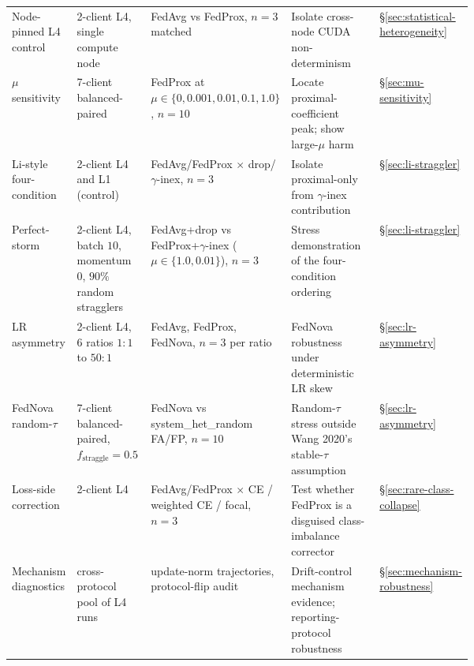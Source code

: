 \documentclass[11pt,a4paper]{report}
\begin{document}
\begin{table}[H]
{\begin{tabular}{l p{0.18\linewidth} p{0.22\linewidth} p{0.28\linewidth} l}
Node-pinned L4 control           & 2-client L4, single compute node             & FedAvg vs FedProx, $n = 3$ matched                       & Isolate cross-node CUDA non-determinism                                       & §\ref{sec:statistical-heterogeneity}            \\
$\mu$ sensitivity                & 7-client balanced-paired                     & FedProx at $\mu \in \{0, 0.001, 0.01, 0.1, 1.0\}$, $n = 10$ & Locate proximal-coefficient peak; show large-$\mu$ harm                      & §\ref{sec:mu-sensitivity}                       \\
Li-style four-condition          & 2-client L4 and L1 (control)                 & FedAvg/FedProx $\times$ drop/$\gamma$-inex, $n = 3$       & Isolate proximal-only from $\gamma$-inex contribution                         & §\ref{sec:li-straggler}                         \\
Perfect-storm                    & 2-client L4, batch $10$, momentum $0$, $90\%$ random stragglers & FedAvg+drop vs FedProx+$\gamma$-inex ($\mu \in \{1.0, 0.01\}$), $n = 3$ & Stress demonstration of the four-condition ordering                        & §\ref{sec:li-straggler}                         \\
LR asymmetry                     & 2-client L4, 6 ratios $1{:}1$ to $50{:}1$    & FedAvg, FedProx, FedNova, $n = 3$ per ratio              & FedNova robustness under deterministic LR skew                                & §\ref{sec:lr-asymmetry}                         \\
FedNova random-$\tau$            & 7-client balanced-paired, $f_{\textrm{straggle}} = 0.5$ & FedNova vs system\_het\_random FA/FP, $n = 10$           & Random-$\tau$ stress outside Wang 2020's stable-$\tau$ assumption             & §\ref{sec:lr-asymmetry}                         \\
Loss-side correction             & 2-client L4                                  & FedAvg/FedProx $\times$ CE / weighted CE / focal, $n = 3$ & Test whether FedProx is a disguised class-imbalance corrector                & §\ref{sec:rare-class-collapse}                  \\
Mechanism diagnostics            & cross-protocol pool of L4 runs               & update-norm trajectories, protocol-flip audit             & Drift-control mechanism evidence; reporting-protocol robustness               & §\ref{sec:mechanism-robustness}                  \\
\hline
\end{tabular}%
}
\end{table}
\end{document}
